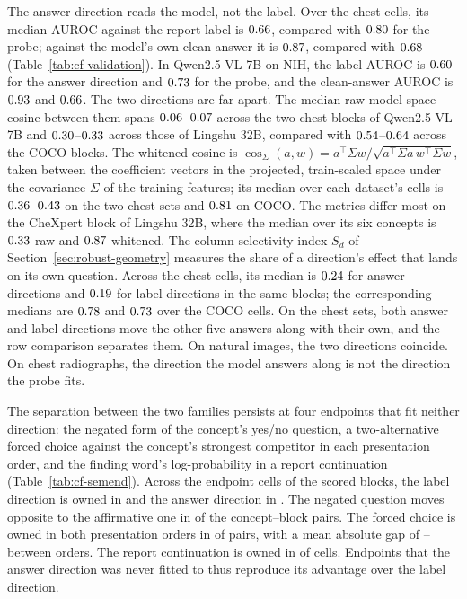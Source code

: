 \documentclass{article}
\begin{document}
The answer direction reads the model, not the label. Over the \cfValAurocAnsChestN{} chest cells, its median AUROC against the report label is $0.66$, compared with $0.80$ for the probe; against the model's own clean answer it is $0.87$, compared with $0.68$ (Table~\ref{tab:cf-validation}). In Qwen2.5-VL-7B on NIH, the label AUROC is $0.60$ for the answer direction and $0.73$ for the probe, and the clean-answer AUROC is $0.93$ and $0.66$. The two directions are far apart. The median raw model-space cosine between them spans $0.06$--$0.07$ across the two chest blocks of Qwen2.5-VL-7B and $0.30$--$0.33$ across those of Lingshu 32B, compared with $0.54$--$0.64$ across the COCO blocks. The whitened cosine is $\cos_\Sigma(a,w)=a^{\top}\Sigma w/\sqrt{a^{\top}\Sigma a\,w^{\top}\Sigma w}$, taken between the coefficient vectors in the projected, train-scaled space under the covariance $\Sigma$ of the training features; its median over each dataset's cells is $0.36$--$0.43$ on the two chest sets and $0.81$ on COCO. The metrics differ most on the CheXpert block of Lingshu 32B, where the median over its six concepts is $0.33$ raw and $0.87$ whitened. The column-selectivity index $S_d$ of Section~\ref{sec:robust-geometry} measures the share of a direction's effect that lands on its own question. Across the \cfAnsColSelChestN{} chest cells, its median is $0.24$ for answer directions and $0.19$ for label directions in the same blocks; the corresponding medians are $0.78$ and $0.73$ over the \cfAnsColSelCocoN{} COCO cells. On the chest sets, both answer and label directions move the other five answers along with their own, and the row comparison separates them. On natural images, the two directions coincide. On chest radiographs, the direction the model answers along is not the direction the probe fits.

The separation between the two families persists at four endpoints that fit neither direction: the negated form of the concept's yes/no question, a two-alternative forced choice against the concept's strongest competitor in each presentation order, and the finding word's log-probability in a report continuation (Table~\ref{tab:cf-semend}). Across the \cfSemCells{} endpoint cells of the \cfSemBlocks{} scored blocks, the label direction is owned in \cfSemLabelOwned{} and the answer direction in \cfSemAnswerOwned{}. The negated question moves opposite to the affirmative one in \cfSemNegOpposite{} of the \cfSemNegN{} concept--block pairs. The forced choice is owned in both presentation orders in \cfSemForcedOwned{} of \cfSemForcedN{} pairs, with a mean absolute gap of \cfSemGapMin{}--\cfSemGapMax{} between orders. The report continuation is owned in \cfSemReportOwned{} of \cfSemReportCells{} cells. Endpoints that the answer direction was never fitted to thus reproduce its advantage over the label direction.
\end{document}
